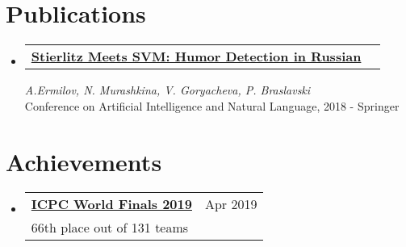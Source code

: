 \documentclass[letterpaper,11pt]{article}
\makeatletter
\newcommand{\simpleItemHeading}[2]{
  \vspace{-1pt}\item
    \begin{tabular*}{0.97\textwidth}[t]{l@{\extracolsep{\fill}}r}
      {\large #1} & #2 \\
    \end{tabular*}\vspace{-5pt}
}
\newcommand{\descItemHeading}[3]{
  \vspace{-1pt}\item
    \begin{tabular*}{0.97\textwidth}[t]{l@{\extracolsep{\fill}}r}
      {\large #1} & #2 \\
      #3 & \\
    \end{tabular*}\vspace{-5pt}
}
\newcommand{\resumeSubHeadingListStart}{\begin{itemize}[leftmargin=*]}
\newcommand{\resumeSubHeadingListEnd}{\end{itemize}}
\makeatother
\begin{document}
\section{Publications}
  \begin{itemize}[leftmargin=*]
    \simpleItemHeading{\href{https://link.springer.com/chapter/10.1007/978-3-030-01204-5_17}{\textbf{Stierlitz Meets SVM: Humor Detection in Russian}}}{}
    
    \textit{A.Ermilov, N. Murashkina, V. Goryacheva, P. Braslavski}\\
    Conference on Artificial Intelligence and Natural Language, 2018 - Springer
    
  \end{itemize}

\section{Achievements}
  \begin{itemize}[leftmargin=*]
      \descItemHeading{\href{https://icpc.global/regionals/finder/world-finals-2019/standings}{\textbf{ICPC World Finals 2019}}}{Apr 2019}
      {66th place out of 131 teams}
  \end{itemize}

%


\end{document}
